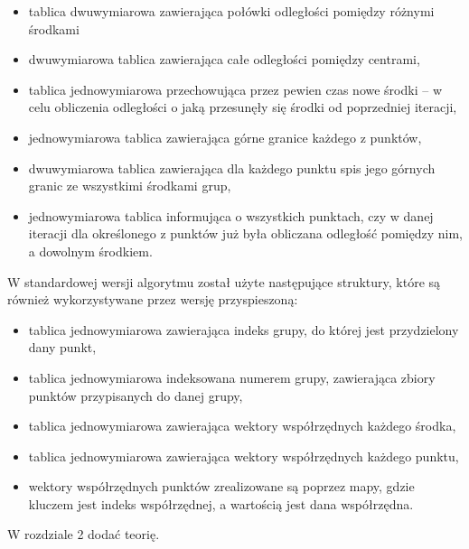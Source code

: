 \documentclass{article}
\begin{document}
\begin{itemize}
	\item tablica dwuwymiarowa zawierająca połówki odległości pomiędzy różnymi środkami
	\item dwuwymiarowa tablica zawierająca całe odległości pomiędzy centrami,
	\item tablica jednowymiarowa przechowująca przez pewien czas nowe środki – w celu obliczenia odległości o jaką przesunęły się środki od poprzedniej iteracji,
	\item jednowymiarowa tablica zawierająca górne granice każdego z punktów,
	\item dwuwymiarowa tablica zawierająca dla każdego punktu spis jego górnych granic ze wszystkimi środkami grup,
	\item jednowymiarowa tablica informująca o wszystkich punktach, czy w danej iteracji dla określonego z punktów już była obliczana odległość pomiędzy nim, a dowolnym środkiem.
\end{itemize}

W standardowej wersji algorytmu został użyte następujące struktury, które są również wykorzystywane przez wersję przyspieszoną:

\begin{itemize}
	\item tablica jednowymiarowa zawierająca indeks grupy, do której jest przydzielony dany punkt,
	\item tablica jednowymiarowa indeksowana numerem grupy, zawierająca zbiory punktów przypisanych do danej grupy,
	\item tablica jednowymiarowa zawierająca wektory współrzędnych każdego środka,
	\item tablica jednowymiarowa zawierająca wektory współrzędnych każdego punktu,
	\item wektory współrzędnych punktów zrealizowane są poprzez mapy, gdzie kluczem jest indeks współrzędnej, a wartością jest dana współrzędna.
\end{itemize}


W rozdziale 2 dodać teorię.
	
\end{document}
